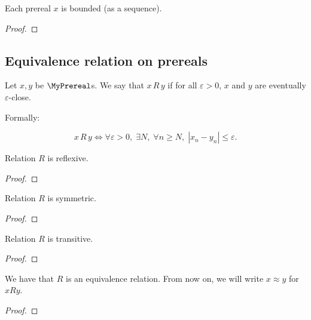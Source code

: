 \begin{lemma}
    \label{MyPrereal.bounded}
    \leanok
    Each prereal $x$ is bounded (as a sequence).
\end{lemma}
\begin{proof}
    \leanok
\end{proof}

\subsection{Equivalence relation on prereals}

\begin{definition}
    \label{MyPrereal.R}
    \leanok
    Let $x,y$ be $\MyPrereal$s.
    We say that $x \, R \, y$ if for all $\varepsilon > 0$, $x$ and $y$ are eventually $\varepsilon$-close.

    Formally:

    \[
    x \, R \, y \iff \forall \varepsilon > 0, \; \exists N, \; \forall n \geq N, \; |x_n - y_n| \leq \varepsilon.
    \]
\end{definition}

\begin{lemma}
    \label{MyPrereal.R_refl}
    \leanok
    Relation $R$ is reflexive.
\end{lemma}
\begin{proof}
    \leanok
\end{proof}

\begin{lemma}
    \label{MyPrereal.R_symm}
    \leanok
    Relation $R$ is symmetric.
\end{lemma}
\begin{proof}
    \leanok
\end{proof}

\begin{lemma}
    \label{MyPrereal.R_trans}
    \leanok
    Relation $R$ is transitive.
\end{lemma}
\begin{proof}
    \leanok
\end{proof}

\begin{lemma}
    \label{MyPrereal.R_equiv}
    \leanok
We have that $R$ is an equivalence relation. From now on, we will write $x \approx y$ for
$x R y$.
\end{lemma}
\begin{proof}
    \leanok
\end{proof}

